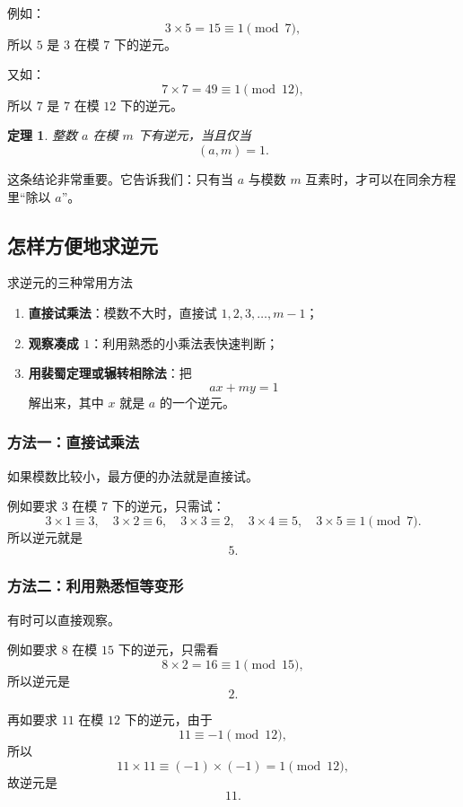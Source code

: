 \documentclass[11pt,a4paper,fontset=fandol]{ctexart}
\theoremstyle{formaltheorem}
\newtheorem{theorem}{定理}[section]
\theoremstyle{formalexample}
\begin{document}
例如：
\[
3\times 5=15\equiv 1\pmod 7,
\]
所以 $5$ 是 $3$ 在模 $7$ 下的逆元。

又如：
\[
7\times 7=49\equiv 1\pmod{12},
\]
所以 $7$ 是 $7$ 在模 $12$ 下的逆元。

\begin{theorem}
整数 $a$ 在模 $m$ 下有逆元，当且仅当
\[
(a,m)=1.
\]
\end{theorem}

这条结论非常重要。它告诉我们：只有当 $a$ 与模数 $m$ 互素时，才可以在同余方程里“除以 $a$”。

\subsection{怎样方便地求逆元}

\begin{goalbox}{求逆元的三种常用方法}
\begin{enumerate}
  \item \textbf{直接试乘法}：模数不大时，直接试 $1,2,3,\dots,m-1$；
  \item \textbf{观察凑成 $1$}：利用熟悉的小乘法表快速判断；
  \item \textbf{用裴蜀定理或辗转相除法}：把
  \[
  ax+my=1
  \]
  解出来，其中 $x$ 就是 $a$ 的一个逆元。
\end{enumerate}
\end{goalbox}

\subsubsection{方法一：直接试乘法}

如果模数比较小，最方便的办法就是直接试。

例如要求 $3$ 在模 $7$ 下的逆元，只需试：
\[
3\times 1\equiv 3,\quad
3\times 2\equiv 6,\quad
3\times 3\equiv 2,\quad
3\times 4\equiv 5,\quad
3\times 5\equiv 1\pmod 7.
\]
所以逆元就是
\[
\boxed{5}.
\]

\subsubsection{方法二：利用熟悉恒等变形}

有时可以直接观察。

例如要求 $8$ 在模 $15$ 下的逆元，只需看
\[
8\times 2=16\equiv 1\pmod{15},
\]
所以逆元是
\[
\boxed{2}.
\]

再如要求 $11$ 在模 $12$ 下的逆元，由于
\[
11\equiv -1\pmod{12},
\]
所以
\[
11\times 11\equiv (-1)\times(-1)=1\pmod{12},
\]
故逆元是
\[
\boxed{11}.
\]
\end{document}
